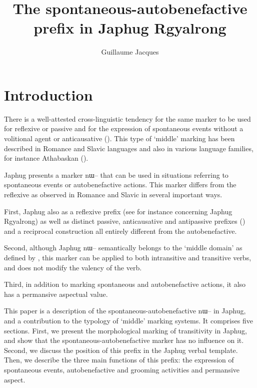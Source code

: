 \documentclass[oldfontcommands,oneside,a4paper,11pt]{article}
\newcommand{\ipa}[1]{{\phon \mbox{#1}}} %
\begin{document}
 
 \title{ The spontaneous-autobenefactive prefix in Japhug Rgyalrong
} 
\author{Guillaume Jacques}
\maketitle
\linenumbers
\sloppy

\section{Introduction}
There is a well-attested cross-linguistic tendency for the same marker to be used for reflexive or passive and for the expression of spontaneous events without a volitional agent or anticausative (\citealt[142-144]{kemmer93middle}). This type of `middle' marking has been described in Romance and Slavic languages and also in various language families, for instance Athabaskan (\citealt{thompson96middle}). 

Japhug presents a marker \ipa{nɯ--} that can be used in situations referring to  spontaneous events or autobenefactive actions. This marker differs from the reflexive as observed in Romance and Slavic in several important ways.

First, Japhug also as a  reflexive prefix (see for instance \citealt{jacques10refl} concerning Japhug Rgyalrong)   as well as distinct passive, anticausative and antipassive prefixes (\citealt{jacques12demotion}) and a reciprocal construction all entirely different from the autobenefactive.


Second, although Japhug  \ipa{nɯ--}  semantically belongs to the ‘middle domain’ as defined by \citet[15]{kemmer93middle}, this marker can be applied to both intransitive and transitive verbs,  and does not modify the valency of the verb.
 
 Third, in addition to marking spontaneous and autobenefactive actions, it also has a permansive aspectual value.
 
 
 This paper is a description of the spontaneous-autobenefactive  \ipa{nɯ--}  in Japhug, and a contribution to the typology of ‘middle’ marking systems. It comprises five sections. First, we present the morphological marking  of transitivity in Japhug, and show that the spontaneous-autobenefactive   marker has no influence on it. Second, we discuss the position of this prefix  in the Japhug verbal template. Then, we describe the three main functions of this prefix: the expression of spontaneous events, autobenefactive and grooming activities and  permansive aspect.
 
\end{document}
